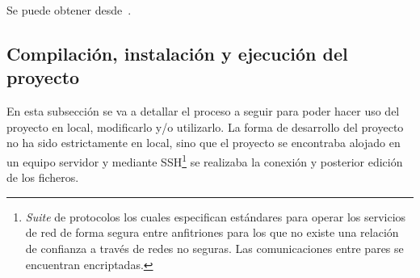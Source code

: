 Se puede obtener desde~\cite{VSCode}.

\subsection{Compilación, instalación y ejecución del proyecto}
En esta subsección se va a detallar el proceso a seguir para poder hacer uso del proyecto en local, modificarlo y/o utilizarlo. La forma de desarrollo del proyecto no ha sido estrictamente en local, sino que el proyecto se encontraba alojado en un equipo servidor y mediante SSH\footnote{\textit{Suite} de protocolos los cuales especifican estándares para operar los servicios de red de forma segura entre anfitriones para los que no existe una relación de confianza a través de redes no seguras. Las comunicaciones entre pares se encuentran encriptadas.} se realizaba la conexión y posterior edición de los ficheros.

